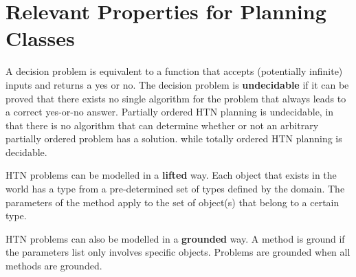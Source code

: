 


\section{Relevant Properties for Planning Classes}
A decision problem is equivalent to a function that accepts (potentially infinite) inputs and returns a yes or no. The decision problem is \textbf{undecidable} if it can be proved that there exists no single algorithm for the problem that always leads to a correct yes-or-no answer. Partially ordered HTN planning is undecidable, in that
there is no algorithm that can determine whether or not an arbitrary partially ordered problem has a solution. while totally ordered HTN planning is decidable.





HTN problems can be modelled in a \textbf{lifted} way. Each object that exists in the world has a type from a pre-determined set of types defined by the domain.
The parameters of the method apply to the set of object(s) that belong to a certain type.

HTN problems can also be modelled in a \textbf{grounded} way. A method is ground if the parameters list only involves specific objects. 
Problems are grounded when all methods are grounded. 

